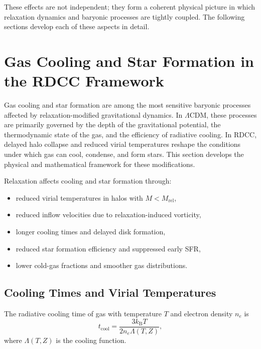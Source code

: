 \documentclass[11pt,a4paper]{article}
\begin{document}
These effects are not independent; they form a coherent physical picture in which relaxation
dynamics and baryonic processes are tightly coupled. The following sections develop each of
these aspects in detail.

\section{Gas Cooling and Star Formation in the RDCC Framework}

Gas cooling and star formation are among the most sensitive baryonic processes affected by
relaxation-modified gravitational dynamics. In $\Lambda$CDM, these processes are primarily
governed by the depth of the gravitational potential, the thermodynamic state of the gas, and
the efficiency of radiative cooling. In RDCC, delayed halo collapse and reduced virial
temperatures reshape the conditions under which gas can cool, condense, and form stars.
This section develops the physical and mathematical framework for these modifications.

Relaxation affects cooling and star formation through:
\begin{itemize}
\item reduced virial temperatures in halos with $M < M_{\mathrm{rel}}$,
\item reduced inflow velocities due to relaxation-induced vorticity,
\item longer cooling times and delayed disk formation,
\item reduced star formation efficiency and suppressed early SFR,
\item lower cold-gas fractions and smoother gas distributions.
\end{itemize}

\subsection{Cooling Times and Virial Temperatures}

The radiative cooling time of gas with temperature $T$ and electron density $n_{e}$ is
\begin{equation}
t_{\mathrm{cool}}
=
\frac{3 k_{\mathrm{B}} T}{2 n_{e} \Lambda(T,Z)},
\end{equation}
where $\Lambda(T,Z)$ is the cooling function.
\end{document}
